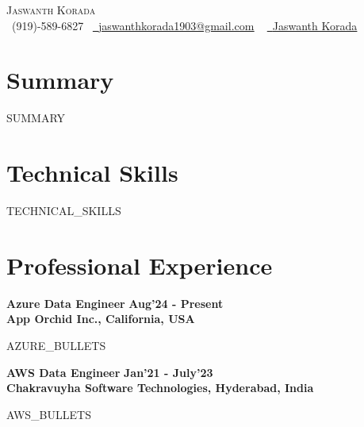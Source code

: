 \documentclass{article}
\begin{document}
\begin{center}
    {\Huge \scshape Jaswanth Korada} \\ \vspace{5pt}
 \raisebox{-0.1\height}\faPhone\ (919)-589-6827~ 
 \href{mailto:jkorada19@gmail.com}{
 \raisebox{-0.2\height}\faEnvelope\  
 \underline{jaswanthkorada1903@gmail.com}} ~ 
 \href{https://linkedin.com/in/korada-jaswanth}{
 \raisebox{-0.2\height}\faLinkedin\ 
 \underline{Jaswanth Korada}}
 \vspace{1pt}
\end{center}

\section*{Summary}
{{SUMMARY}}

\section*{Technical Skills}
{{TECHNICAL_SKILLS}}

\vspace{-0.5em}

\section*{Professional Experience}
\vspace{0.1em}

\textbf{Azure Data Engineer} \hfill \textbf{Aug'24 - Present} \\
\textbf{App Orchid Inc., California, USA} \\[-0.5pt]
\vspace{-0.1em}

\begin{itemize}[leftmargin=1.5em, itemsep=-0.3em, topsep=0em]
{{AZURE_BULLETS}}
\end{itemize}

\textbf{AWS Data Engineer} \hfill \textbf{Jan'21 - July'23} \\
\textbf{Chakravuyha Software Technologies, Hyderabad, India} \\[-0.5pt]
\vspace{-0.1em}

\begin{itemize}[leftmargin=1.5em, itemsep=-0.3em, topsep=0em]
{{AWS_BULLETS}}
\end{itemize}
\end{document}
